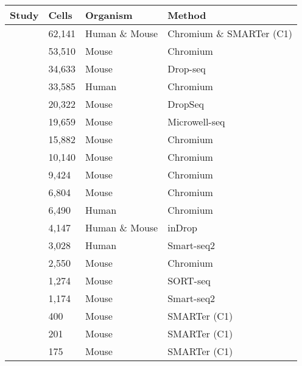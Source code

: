 \begin{table}[]
	\begin{tabular}{@{}llll@{}}
		\toprule
		Study                                                & Cells   & Organism       & Method \\ \midrule
		\cite{Hermann2018Mammalian}		& 62,141  & Human \& Mouse & Chromium \& SMARTer (C1) \\
		\cite{Ernst2019Staged}					& 53,510  & Mouse          & Chromium\\
		\cite{Green2018Comprehensive}	& 34,633  & Mouse          & Drop-seq    \\
		\cite{Sohni2019Neonatal}				& 33,585  & Human          & Chromium             \\
		\cite{Jung2019Unified}              & 20,322  & Mouse          & DropSeq                  \\
		\cite{Han2018Mapping}               & 19,659  & Mouse          & Microwell-seq          \\
		\cite{Grive2019Dynamic}             & 15,882  & Mouse          & Chromium                \\
		\cite{Law2019Developmental}         & 10,140  & Mouse          & Chromium             \\
		\cite{La2018Identification}         & 9,424   & Mouse          & Chromium                   \\
		\cite{Fang2019Proteomics}           & 6,804   & Mouse          & Chromium                \\
		\cite{Guo2018adult}                 & 6,490   & Human          & Chromium                  \\
		\cite{Xia2019Widespread}            & 4,147   & Human \& Mouse & inDrop            \\
		\cite{Wang2018SingleCell}           & 3,028   & Human          & Smart-seq2          \\
		\cite{Lukassen2018Characterization} & 2,550   & Mouse          & Chromium        \\
		\cite{Vertesy2019Dynamics}          & 1,274   & Mouse          & SORT-seq             \\
		\cite{Chen2018Singlecell}           & 1,174   & Mouse          & Smart-seq2              \\
		\cite{Stevant2018Deciphering}       & 400     & Mouse          & SMARTer (C1)     \\
		\cite{Song2016Homeobox}             & 201     & Mouse          & SMARTer (C1)      \\
		\cite{Makino2019Single}             & 175     & Mouse          & SMARTer (C1)             \\

\end{tabular}
\end{table}
